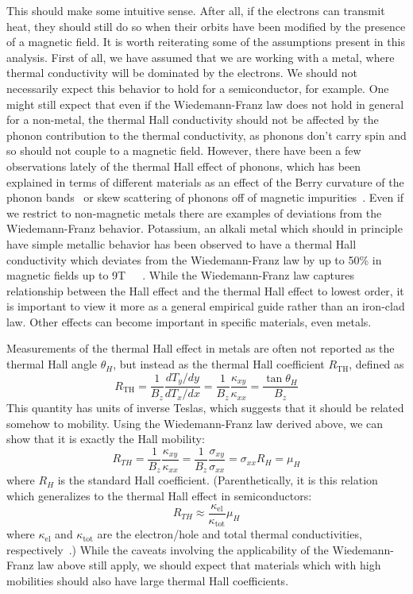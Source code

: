 \documentclass{thesis-umich}
\begin{document}
This should make some intuitive sense. After all, if the electrons can transmit
heat, they should still do so when their orbits have been modified by the
presence of a magnetic field. It is worth reiterating some of the assumptions
present in this analysis. First of all, we have assumed that we are working
with a metal, where thermal conductivity will be dominated by the electrons. We
should not necessarily expect this behavior to hold for a semiconductor, for
example. One might still expect that even if the Wiedemann-Franz law does not
hold in general for a non-metal, the thermal Hall conductivity should not be
affected by the phonon contribution to the thermal conductivity, as phonons
don't carry spin and so should not couple to a magnetic field. However, there
have been a few observations lately of the thermal Hall effect of phonons,
which has been explained in terms of different materials as an effect of the
Berry curvature of the phonon bands~\cite{Zhang2011} or skew scattering of
phonons off of magnetic impurities~\cite{Mori2014}. Even if we restrict to
non-magnetic metals there are examples of deviations from the Wiedemann-Franz
behavior. Potassium, an alkali metal which should in principle have simple
metallic behavior has been observed to have a thermal Hall conductivity which deviates from the Wiedemann-Franz law by
up to 50\% in magnetic fields up to
9T~\cite{Tausch1977}~\cite{Fletcher1978}~\cite{Tausch1979}. While the
Wiedemann-Franz law captures relationship between the Hall effect and the
thermal Hall effect to lowest order, it is important to view it more as a
general empirical guide rather than an iron-clad law. Other effects can become
important in specific materials, even metals.

Measurements of the thermal Hall effect in metals are often not reported as the
thermal Hall angle $\theta_H$, but instead as the thermal Hall coefficient
$R_{\mathrm{TH}}$, defined as \[ R_{\mathrm{TH}} = \frac{1}{B_z}
\frac{dT_y/dy}{dT_x/dx} = \frac{1}{B_z} \frac{\kappa_{xy}}{\kappa_{xx}} =
\frac{\tan \theta_H}{B_z}\] This quantity has units of inverse Teslas, which
suggests that it should be related somehow to mobility. Using the
Wiedemann-Franz law derived above, we can show that it is exactly the Hall
mobility: \[ R_{TH} = \frac{1}{B_z}\frac{\kappa_{xy}}{\kappa_{xx}} =
\frac{1}{B_z}\frac{\sigma_{xy}}{\sigma_{xx}} = \sigma_{xx}R_H = \mu_H\] where
$R_H$ is the standard Hall coefficient. (Parenthetically, it is this relation
which generalizes to the thermal Hall effect in semiconductors:\[R_{TH} \approx
\frac{\kappa_{\mathrm{el}}}{\kappa_{\mathrm{tot}}} \mu_H\] where
$\kappa_{\mathrm{el}}$ and $\kappa_{\mathrm{tot}}$ are the electron/hole and
total thermal conductivities, respectively~\cite{Putley}.) While the caveats involving the applicability of the Wiedemann-Franz law above still apply, we should expect that materials which with high mobilities should also have large thermal Hall coefficients. 
\end{document}
